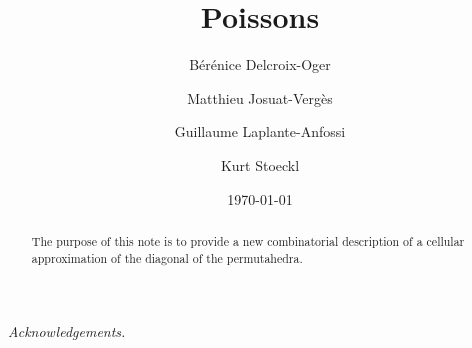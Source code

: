 \documentclass[11pt]{amsart}
\title{Poissons}
\author{B\'er\'enice Delcroix-Oger}
\author{Matthieu Josuat-Verg\`es}
\author{Guillaume Laplante-Anfossi}
\author{Kurt Stoeckl}
\date{\today}
\begin{document}

\begin{abstract}
The purpose of this note is to provide a new combinatorial description of a cellular approximation of the diagonal of the permutahedra. 
\end{abstract}


\maketitle


\setcounter{tocdepth}{1}










\bigskip 

\emph{Acknowledgements.}    




\end{document}
